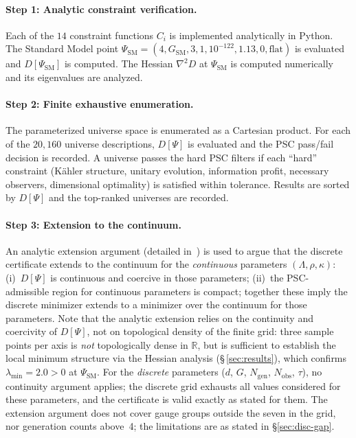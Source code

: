 \documentclass[11pt,twocolumn]{article}
\theoremstyle{remark}
\begin{document}
\paragraph{Step 1: Analytic constraint verification.}
Each of the $14$ constraint functions $C_i$ is implemented
analytically in Python.
The Standard Model point $\Psi_{\mathrm{SM}}=(4, G_{\mathrm{SM}},
3, 1, 10^{-122}, 1.13, 0, \text{flat})$ is evaluated and
$D[\Psi_{\mathrm{SM}}]$ is computed.
The Hessian $\nabla^2 D$ at $\Psi_{\mathrm{SM}}$ is computed
numerically and its eigenvalues are analyzed.

\paragraph{Step 2: Finite exhaustive enumeration.}
The parameterized universe space is enumerated as a Cartesian
product.
For each of the $20{,}160$ universe descriptions, $D[\Psi]$ is
evaluated and the PSC pass/fail decision is recorded.
A universe passes the hard PSC filters if each ``hard'' constraint
(K\"{a}hler structure, unitary evolution, information profit, necessary
observers, dimensional optimality) is satisfied within tolerance.
Results are sorted by $D[\Psi]$ and the top-ranked universes are
recorded.

\paragraph{Step 3: Extension to the continuum.}
An analytic extension argument (detailed in~\cite{SpivackPSCConcordance})
is used to argue that the discrete certificate extends to the
continuum for the \emph{continuous} parameters $(\Lambda, \rho,
\kappa)$: (i)~$D[\Psi]$ is continuous and coercive in those
parameters; (ii)~the PSC-admissible region for continuous parameters
is compact; together these imply the discrete minimizer extends to
a minimizer over the continuum for those parameters.
Note that the analytic extension relies on the continuity and
coercivity of $D[\Psi]$, not on topological density of the finite
grid: three sample points per axis is \emph{not} topologically dense
in $\mathbb{R}$, but is sufficient to establish the local minimum
structure via the Hessian analysis (\S\,\ref{sec:results}), which
confirms $\lambda_{\min}=2.0>0$ at $\Psi_{\mathrm{SM}}$.
For the \emph{discrete} parameters ($d$, $G$, $N_{\mathrm{gen}}$,
$N_{\mathrm{obs}}$, $\tau$), no continuity argument applies;
the discrete grid exhausts all values considered for these parameters,
and the certificate is valid exactly as stated for them.
The extension argument does not cover gauge groups outside the
seven in the grid, nor generation counts above~4; the limitations
are as stated in §\ref{sec:disc-gap}.
\end{document}

